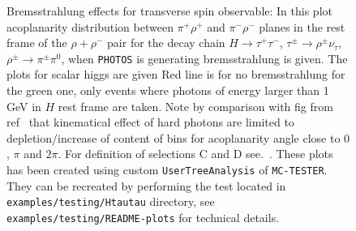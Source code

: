 \documentclass[]{Photos_interface_design}
\begin{document}
\begin{figure}[h!]
\centering
{}
\caption{Bremsstrahlung effects for transverse spin observable:
In this plot acoplanarity distribution between $\pi^+\rho^+$ and 
$\pi^-\rho^-$ planes in the rest frame of the $\rho+ \rho^-$ pair
for the decay
chain  $H\to \tau^+\tau^-$, $\tau^\pm \to \rho^\pm \nu_\tau$, 
$\rho^\pm \to \pi^\pm \pi^0$, when {\tt PHOTOS} is generating bremsstrahlung is given.
The plots for scalar higgs are given
Red line is for no bremsstrahlung for the green one,
only events where photons of energy larger than 1 GeV in $H$ rest frame are taken.
Note by comparison with fig from ref~\cite{tauolaC++} that kinematical effect
of hard photons are limited to depletion/increase of content of bins for acoplanarity angle close to $0$, $\pi$ and $2\pi$. For definition of selections C and D see.~\cite{Bower:2002zx}.
These plots has been created using custom {\tt UserTreeAnalysis} of {\tt MC-TESTER}.
They can be recreated by performing the test located in {\tt examples/testing/Htautau} directory, see  {\tt examples/testing/README-plots} for technical details.
\label{fig:acoplanarity}
}
\end{figure}
\end{document}
